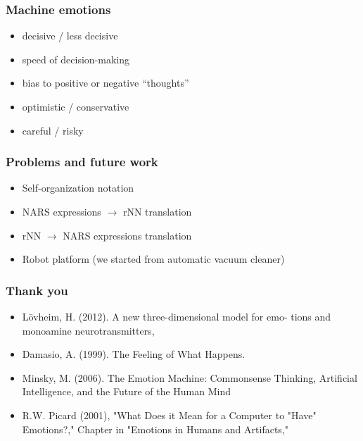 \documentclass[12pt]{beamer}
\begin{document}

\begin{frame}
\frametitle{Machine emotions}
\begin{itemize}
 \item decisive / less decisive
 \item speed of decision-making
 \item bias to positive or negative ``thoughts''
 \item optimistic / conservative
 \item careful / risky
\end{itemize}
\end{frame}



\begin{frame}
\frametitle{Problems and future work}
\begin{itemize}
 \item Self-organization notation
 \item NARS expressions $\rightarrow$ rNN translation
 \item rNN $\rightarrow$ NARS expressions translation
 \item Robot platform (we started from automatic vacuum cleaner)
\end{itemize}
\end{frame}


\begin{frame}
\frametitle{Thank you}

\begin{itemize}
\item L\"{o}vheim, H. (2012). A new three-dimensional model for emo- tions and monoamine neurotransmitters,
\item Damasio, A. (1999). The Feeling of What Happens.
\item Minsky, M. (2006). The Emotion Machine: Commonsense Thinking, Artificial Intelligence, and the Future of the Human Mind
\item R.W. Picard (2001), "What Does it Mean for a Computer to "Have" Emotions?," Chapter in "Emotions in Humans and Artifacts,"
\end{itemize}

\end{frame}

\end{document}
